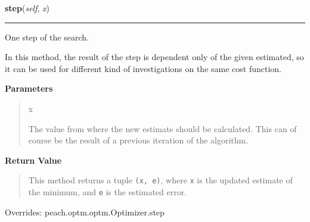     \vspace{0.5ex}

    \begin{boxedminipage}{\textwidth}

    \raggedright \textbf{step}(\textit{self}, \textit{x})

    \vspace{-1.5ex}

    \rule{\textwidth}{0.5\fboxrule}

One step of the search.

In this method, the result of the step is dependent only of the given
estimated, so it can be used for different kind of investigations on the
same cost function.
    \vspace{1ex}

      \textbf{Parameters}
      \begin{quote}
        \begin{Ventry}{x}

          \item[x]


The value from where the new estimate should be calculated. This can
of course be the result of a previous iteration of the algorithm.
        \end{Ventry}

      \end{quote}

    \vspace{1ex}

      \textbf{Return Value}
      \begin{quote}

This method returns a tuple \texttt{(x, e)}, where \texttt{x} is the updated
estimate of the minimum, and \texttt{e} is the estimated error.
      \end{quote}

    \vspace{1ex}

      Overrides: peach.optm.optm.Optimizer.step

    \end{boxedminipage}

    \vspace{0.5ex}


